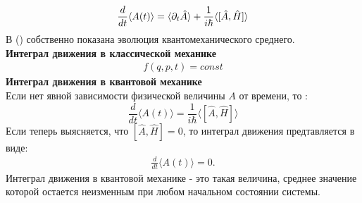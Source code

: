 \documentclass[__main__.tex]{subfiles}
\begin{document}
\begin{gather}
\llabel{_30:final}
\frac{d}{dt}\langle A(t) \rangle = \langle \partial_{t}\hat{A} \rangle + \frac{1}{i\hbar}\langle [\hat{A},\hat{H}] \rangle
\end{gather}
В () собственно показана эволюция квантомеханического среднего.\\
\textbf{Интеграл движения в классической механике}\\
\begin{gather*}
f(q,p,t) = const
\end{gather*}
\textbf{Интеграл движения в квантовой механике}\\
Если нет явной зависимости физической величины $A$ от времени, то :
$$
\frac{d}{dt}\langle A(t) \rangle =\frac{1}{i\hbar}\langle [\hat{A},\hat{H}] \rangle
$$
Если теперь выясняется, что $ [\hat{A},\hat{H}]=0$, то интеграл движения предтавляется в виде:
\begin{gather*}
\frac{d}{dt}\langle A(t) \rangle=0.
\end{gather*}
Интеграл движения в квантовой механике - это такая величина, среднее значение которой остается неизменным при любом начальном состоянии системы.
\end{document}
